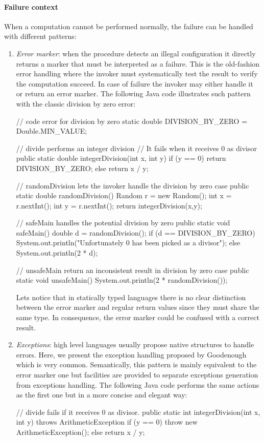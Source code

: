 \documentclass[a4paper]{report}
\begin{document}
\paragraph{Failure context} When a computation cannot be performed normally, the failure can be handled with different patterns:
\begin{enumerate}
\item \emph{Error marker}: when the procedure detects an illegal configuration it directly returns a marker that must be interpreted as a failure. This is the old-fashion error handling where the invoker must systematically test the result to verify the computation succeed. In case of failure the invoker may either handle it or return an error marker. The following Java code illustrates such pattern with the classic division by zero error:
\begin{java}
// code error for division by zero
static double DIVISION_BY_ZERO = Double.MIN_VALUE;
	
// divide performs an integer division
// It fails when it receives 0 as divisor
public static double integerDivision(int x, int y) {
	if (y == 0) {
		return DIVISION_BY_ZERO;
	} else {
		return x / y;
	}
}

// randomDivision lets the invoker handle the division by zero case
public static double randomDivision() {
	Random r = new Random();
	int x = r.nextInt();
	int y = r.nextInt();
	return integerDivision(x,y);
}

// safeMain handles the potential division by zero
public static void safeMain() {
	double d = randomDivision();
	if (d == DIVISION_BY_ZERO) {
		System.out.println("Unfortunately 0 has been picked as a divisor");
	} else {
		System.out.println(2 * d);
	}
}

// unsafeMain return an inconsistent result in division by zero case
public static void unsafeMain() {
	System.out.println(2 * randomDivision());
}
\end{java}
Lets notice that in statically typed languages there is no clear distinction between the error marker and regular return values since they must share the same type. In consequence, the error marker could be confused with a correct result.
\item \emph{Exceptions}: high level languages usually propose native structures to handle errors. Here, we present the exception handling proposed by Goodenough\cite{exception} which is very common. Semantically, this pattern is mainly equivalent to the error marker one but facilities are provided to separate exceptions generation from exceptions handling. The following Java code performs the same actions as the first one but in a more concise and elegant way:
\begin{java}
// divide fails if it receives 0 as divisor.
public static int integerDivision(int x, int y) throws ArithmeticException {
	if (y == 0) {
		throw new ArithmeticException();
	} else {
		return x / y;
	}
}


\end{java}
\end{enumerate}
\end{document}
